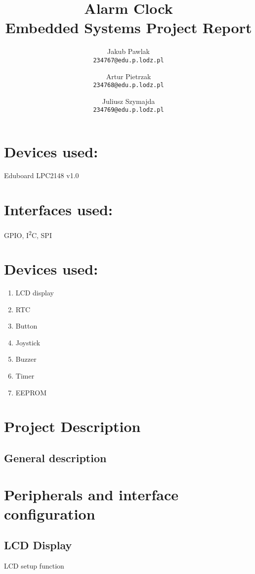 \documentclass[12pt]{article}
\title{\huge\bf\vspace{-1em} Alarm Clock \\ Embedded Systems Project Report\\\vspace{2em}{\large\normalfont Monday 10:00 lab} }
\author{
    Jakub Pawlak \\
    \texttt{234767@edu.p.lodz.pl}
    \and
    Artur Pietrzak \\
    \texttt{234768@edu.p.lodz.pl}
    \and
    Juliusz Szymajda \\
    \texttt{234769@edu.p.lodz.pl}
}
\newcommand{\code}[3]{}
\begin{document}
    \maketitle
    \clearpage
    \large
    \section*{Devices used:}
    Eduboard LPC2148 v1.0
    \section*{Interfaces used:}
    GPIO, I\textsuperscript{2}C, SPI
    \section*{Devices used:}
    \begin{enumerate}
        \item LCD display
        \item RTC
        \item Button
        \item Joystick
        \item Buzzer
        \item Timer
        \item EEPROM
    \end{enumerate}
    \clearpage
    \tableofcontents
    \clearpage

    \section{Project Description}
    \subsection{General description}
    \section{Peripherals and interface configuration}
    \subsection{LCD Display}
    \begin{program}[h]
        \code{62}{95}{display.h}
        \caption{LCD setup function}
    \end{program}

    \clearpage
\end{document}
